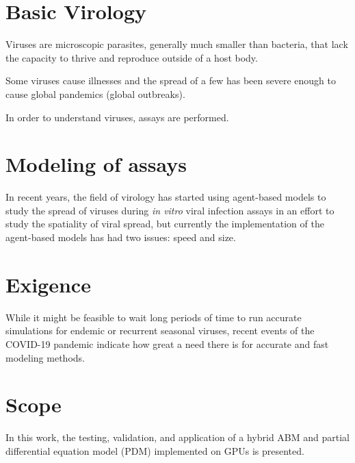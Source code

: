 
\section{Basic Virology}
Viruses are microscopic parasites, generally much smaller than bacteria, that lack the capacity to thrive and reproduce outside of a host body. 

Some viruses cause illnesses and the spread of a few has been severe enough to cause global pandemics (global outbreaks). 

In order to understand viruses, assays are performed. 

\section{Modeling of assays}

In recent years, the field of virology has started using agent-based models to study the spread of viruses during \emph{in vitro} viral infection assays \citep{beauchemin_simple_2005,alvarado_cellular-level_2018,wodarz_laws_2014,tong_development_2015,whitman20,goyal16,itakura10,wasik14} in an effort to study the spatiality of viral spread, but currently the implementation of the agent-based models has had two issues: speed and size. 

\section{Exigence}
While it might be feasible to wait long periods of time to run accurate simulations for endemic or recurrent seasonal viruses, recent events of the COVID-19 pandemic indicate how great a need there is for accurate and fast modeling methods. 

\section{Scope}

In this work, the testing, validation, and application of a hybrid ABM and partial differential equation model (PDM) implemented on GPUs is presented. 



